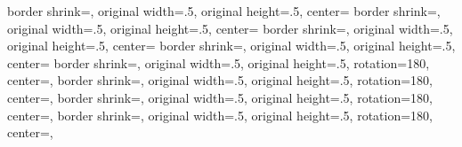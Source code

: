 %
%
%
%
%
%
%
{%
	\edef\pgfpageoptionheight{\the\paperheight}%
	\edef\pgfpageoptionwidth{\the\paperwidth}%
	\edef\pgfpageoptionborder{1pt}%
}
{%
  {%
    border shrink=\pgfpageoptionborder,%
	original width=.5\pgfpageoptionheight,%
	original height=.5\pgfpageoptionwidth,%
    center=\pgfpoint{0\pgfphysicalwidth}{\pgfphysicalheight}%
  }%
  {%
    border shrink=\pgfpageoptionborder,%
	original width=.5\pgfpageoptionheight,%
	original height=.5\pgfpageoptionwidth,%
    center=\pgfpoint{.5\pgfphysicalwidth}{\pgfphysicalheight}%
  }%
  {%
    border shrink=\pgfpageoptionborder,%
	original width=.5\pgfpageoptionheight,%
	original height=.5\pgfpageoptionwidth,%
    center=\pgfpoint{0\pgfphysicalwidth}{.5\pgfphysicalheight}%
  }%
  {%
    border shrink=\pgfpageoptionborder,%
	original width=.5\pgfpageoptionheight,%
	original height=.5\pgfpageoptionwidth,%
    center=\pgfpoint{.5\pgfphysicalwidth}{.5\pgfphysicalheight}%
  }%
  {%
  	border shrink=\pgfpageoptionborder,%
	original width=.5\pgfpageoptionheight,%
	original height=.5\pgfpageoptionwidth,%
	rotation=180,%
    center=\pgfpoint{\pgfphysicalwidth}{.5\pgfphysicalheight},%
  }%
  {%
  	border shrink=\pgfpageoptionborder,%
	original width=.5\pgfpageoptionheight,%
	original height=.5\pgfpageoptionwidth,%
	rotation=180,%
    center=\pgfpoint{.5\pgfphysicalwidth}{.5\pgfphysicalheight},%
  }%
  {%
	border shrink=\pgfpageoptionborder,%
	original width=.5\pgfpageoptionheight,%
	original height=.5\pgfpageoptionwidth,%
	rotation=180,%
    center=\pgfpoint{\pgfphysicalwidth}{0\pgfphysicalheight},%
  }%
  {%
	border shrink=\pgfpageoptionborder,%
	original width=.5\pgfpageoptionheight,%
	original height=.5\pgfpageoptionwidth,%
	rotation=180,%
    center=\pgfpoint{.5\pgfphysicalwidth}{0\pgfphysicalheight},%
  }%
}%